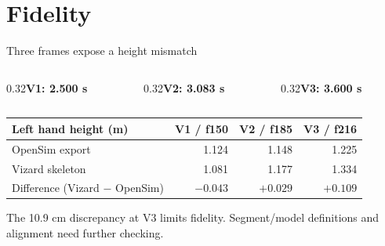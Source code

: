 \section{Fidelity}
\begin{frame}{Three frames expose a height mismatch}
\begin{columns}[T,onlytextwidth]
\begin{column}{0.32\textwidth}\centering\textbf{V1: 2.500 s}\par\par\smallskip{}\end{column}
\begin{column}{0.32\textwidth}\centering\textbf{V2: 3.083 s}\par\par\smallskip{}\end{column}
\begin{column}{0.32\textwidth}\centering\textbf{V3: 3.600 s}\par\par\smallskip{}\end{column}
\end{columns}
\par\smallskip\centering\small
\begin{tabular}{@{}lrrr@{}}\toprule
Left hand height (m) & V1 / f150 & V2 / f185 & V3 / f216\\\midrule
OpenSim export & 1.124 & 1.148 & 1.225\\
Vizard skeleton & 1.081 & 1.177 & 1.334\\
Difference (Vizard $-$ OpenSim) & $-0.043$ & $+0.029$ & $\mathbf{+0.109}$\\\bottomrule
\end{tabular}\par
\par\medskip\raggedright\small
The 10.9 cm discrepancy at V3 limits fidelity. Segment/model definitions and alignment need further checking.
\end{frame}

